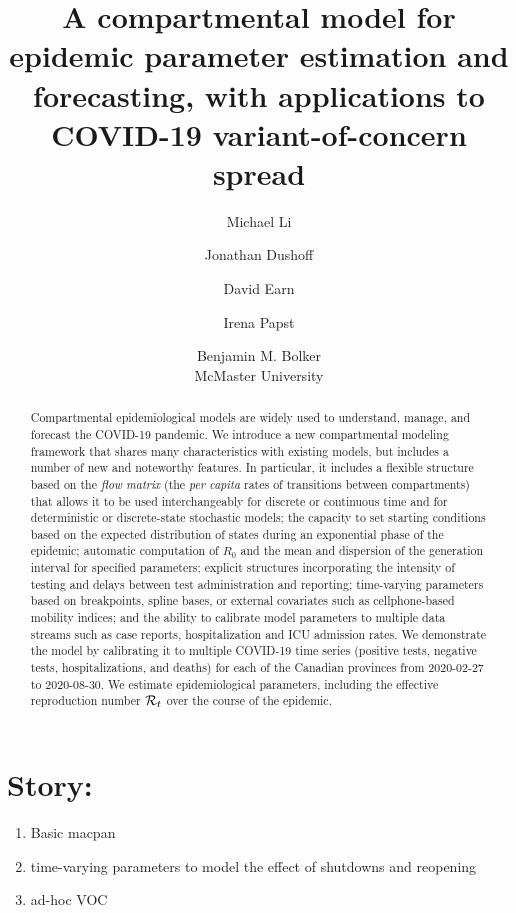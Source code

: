 \documentclass[12pt]{article}\usepackage[]{graphicx}\usepackage[]{color}
\title{A compartmental model for epidemic parameter estimation and forecasting, with applications to COVID-19 variant-of-concern spread}
\author{Michael Li \and Jonathan Dushoff \and David Earn \and Irena Papst \and Benjamin M. Bolker \\
  McMaster University\\
}
\begin{document}
\linenumbers
\maketitle

\section*{Story:}
\begin{enumerate}
\item{Basic macpan}
\item{time-varying parameters to model the effect of shutdowns and reopening}
\item{ad-hoc VOC}
\end{enumerate}

\begin{abstract}
Compartmental epidemiological models are widely used to understand, manage, and forecast the COVID-19 pandemic. 
We introduce a new compartmental modeling framework that shares many characteristics with existing models, but includes a number of new and noteworthy features.
In particular, it includes a flexible structure based on the \emph{flow matrix} (the \emph{per capita} rates of transitions between compartments) that allows it to be used interchangeably for discrete or continuous time and for deterministic or discrete-state stochastic models; the capacity to set starting conditions based on the expected distribution of states during an exponential phase of the epidemic; automatic computation of $R_0$ and the mean and dispersion of the generation interval for specified parameters; explicit structures incorporating the intensity of testing and delays between test administration and reporting; time-varying parameters based on breakpoints, spline bases, or external covariates such as cellphone-based mobility indices; and the ability to calibrate model parameters to multiple data streams such as case reports, hospitalization and ICU admission rates.
We demonstrate the model by calibrating it to multiple COVID-19 time series (positive tests, negative tests, hospitalizations, and deaths) for each of the Canadian provinces from 2020-02-27 to 2020-08-30.  
We estimate epidemiological parameters, including the effective reproduction number ${\mathcal R}_t$ over the course of the epidemic.
\end{abstract}

\end{document}
